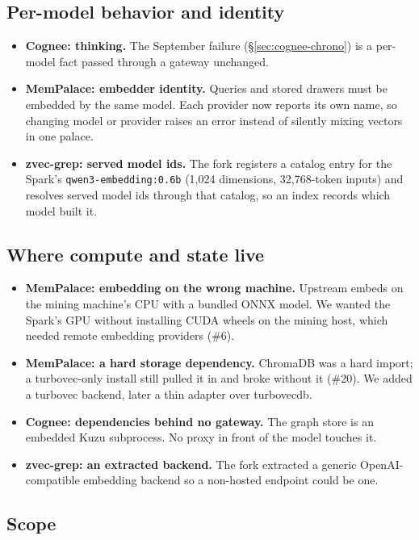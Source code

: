 \documentclass[11pt]{article}
\newcommand{\code}[1]{\texttt{#1}}
\begin{document}
\subsection{Per-model behavior and identity}

\begin{itemize}
  \item \textbf{Cognee: thinking.} The September failure (\S\ref{sec:cognee-chrono}) is a per-model
    fact passed through a gateway unchanged.
  \item \textbf{MemPalace: embedder identity.} Queries and stored drawers must be embedded by the
    same model. Each provider now reports its own name, so changing model or provider raises an
    error instead of silently mixing vectors in one palace.
  \item \textbf{zvec-grep: served model ids.} The fork registers a catalog entry for the Spark's
    \code{qwen3-embedding:0.6b} (1,024 dimensions, 32,768-token inputs) and resolves served model ids
    through that catalog, so an index records which model built it.
\end{itemize}

\subsection{Where compute and state live}

\begin{itemize}
  \item \textbf{MemPalace: embedding on the wrong machine.} Upstream embeds on the mining machine's
    CPU with a bundled ONNX model. We wanted the Spark's GPU without installing CUDA wheels on the
    mining host, which needed remote embedding providers (\#6).
  \item \textbf{MemPalace: a hard storage dependency.} ChromaDB was a hard import; a turbovec-only
    install still pulled it in and broke without it (\#20). We added a turbovec backend, later a thin
    adapter over turbovecdb.
  \item \textbf{Cognee: dependencies behind no gateway.} The graph store is an embedded Kuzu
    subprocess. No proxy in front of the model touches it.
  \item \textbf{zvec-grep: an extracted backend.} The fork extracted a generic OpenAI-compatible
    embedding backend so a non-hosted endpoint could be one.
\end{itemize}

\subsection{Scope}
\end{document}
